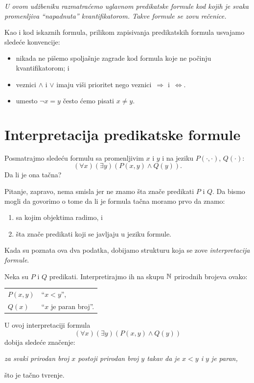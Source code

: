 \begin{NAP}\it
U ovom ud\v zbeniku razmatra\'cemo uglavnom predikatske formule kod kojih je svaka promenljiva
\enquote{napadnuta} kvantifikatorom. Takve formule se zovu \emph{re\v cenice}.
\end{NAP}

\begin{CONVENTION}
  Kao i kod iskaznih formula, prilikom zapisivanja predikatskih formula usvajamo slede\'ce konvencije:
  \begin{itemize}
  \item
    nikada ne pi\v semo spolja\v snje zagrade kod formula koje ne po\v cinju kvantifikatorom; i
  \item
    veznici $\land$ i $\lor$ imaju vi\v si prioritet nego veznici~$\Rightarrow$ i~$\Leftrightarrow$.
  \item
    umesto $\lnot x = y$ \v cesto \'cemo pisati $x \ne y$.
  \end{itemize}
\end{CONVENTION}


\section{Interpretacija predikatske formule}

Posmatrajmo slede\'cu formulu sa promenljivim $x$ i $y$ i na jeziku $P(\cdot, \cdot)$, $Q(\cdot)$:
$$
  (\forall x)(\exists y)(P(x, y) \land Q(y)).
$$
Da li je ona ta\v cna?

\bigskip

Pitanje, zapravo, nema smisla jer ne znamo \v sta zna\v ce predikati $P$ i $Q$. Da bismo mogli da govorimo o
tome da li je formula ta\v cna moramo prvo da znamo:
\begin{enumerate}
\item
  sa kojim objektima radimo, i
\item
  \v sta zna\v ce predikati koji se javljaju u jeziku formule.
\end{enumerate}
Kada su poznata ova dva podatka, dobijamo strukturu koja se zove \emph{interpretacija formule}.

\begin{EX}
  Neka su $P$ i $Q$ predikati. Interpretirajmo ih na skupu $\mathbb{N}$ prirodnih brojeva ovako:

  \medskip

  \begin{tabular}{l@{\quad$\leadsto$\quad}l}
    $P(x, y)$ & \enquote{$x < y$},\\
    $Q(x)$ & \enquote{$x$ je paran broj}.
  \end{tabular}
  
  \medskip
  
  \noindent
  U ovoj interpretaciji formula
  $$
    (\forall x)(\exists y)(P(x, y) \land Q(y))
  $$
  dobija slede\'ce zna\v cenje:
  \begin{center}
    \textit{za svaki prirodan broj $x$ postoji prirodan broj $y$ takav da je $x < y$ i $y$ je paran,}
  \end{center}
  \v sto je ta\v cno tvr\dj enje.
\end{EX}

